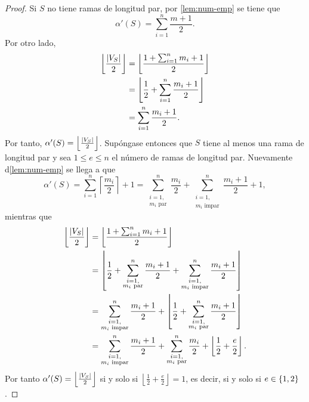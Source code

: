 \begin{proof}
    Si $S$ no tiene ramas de longitud par, por \cref{lem:num-emp} se tiene que
    \[
        \alpha'(S) = \sum_{i=1}^{n}\frac{m+1}{2}.
    \]
    Por otro lado,
    \begin{align*}
        \left\lfloor\frac{\left|V_S\right|}{2}\right\rfloor 
            &=\left\lfloor\frac{1 + \sum_{i=1}^{n} m_i+1}{2}\right\rfloor \\
            &=\left\lfloor\frac{1}{2} + \sum_{i=1}^{n} \frac{m_i+1}{2}\right\rfloor\\
            &= \sum_{i=1}^{n} \frac{m_i+1}{2}.
    \end{align*}
    Por tanto, $\alpha'(S)= \left\lfloor\frac{\left|V_S\right|}{2}\right\rfloor$.
    Sup\'ongase entonces que $S$ tiene al menos una rama de longitud par y sea
    $1\leq e \leq n$ el n\'umero de ramas de longitud par. Nuevamente
    d\cref{lem:num-emp} se llega a que
    \[
        \alpha'(S) = \sum_{i=1}^{n}\left\lceil\frac{m_i}{2}\right\rceil + 1 = 
        \sum_{\substack{i=1, \\ m_i \text{ par}}}^n \frac{m_i}{2} + \sum_{
            \substack{i=1, \\ m_i \text{ impar}}}^{n}\frac{m_i+1}{2} + 1,
    \]
    mientras que
    \begin{align*}
        \left\lfloor\frac{\left|V_S\right|}{2}\right\rfloor 
            &=\left\lfloor\frac{1 + \sum_{i=1}^{n} m_i+1}{2}\right\rfloor \\
            &=\left\lfloor\frac{1}{2} + \sum_{\substack{i=1, \\ m_i \text{ 
                par}}}^{n}\frac{m_i+1}{2}+ \sum_{\substack{i=1, \\ m_i 
                \text{ impar}}}^{n} \frac{m_i+1}{2}\right\rfloor\\
            &= \sum_{\substack{i=1, \\ m_i \text{ impar}}}^{n} \frac{m_i+1}{2}
                + \left\lfloor \frac{1}{2} + \sum_{\substack{i=1, \\ m_i 
                \text{ par}}}^{n}\frac{m_i+1}{2}\right\rfloor\\
            &= \sum_{\substack{i=1, \\ m_i \text{ impar}}}^{n} \frac{m_i+1}{2}
                + \sum_{\substack{i=1, \\ m_i \text{ par}}}^{n}\frac{m_i}{2} + 
                \left\lfloor\frac{1}{2} + \frac{e}{2}\right\rfloor.
    \end{align*}
    Por tanto $\alpha'(S)= \left\lfloor\frac{\left|V_S\right|}{2}\right\rfloor$ si y
    solo si $\left\lfloor\frac{1}{2} + \frac{e}{2}\right\rfloor = 1$, es decir,
    si y solo si $e\in\left\{ 1,2\right\}$.

\end{proof}

